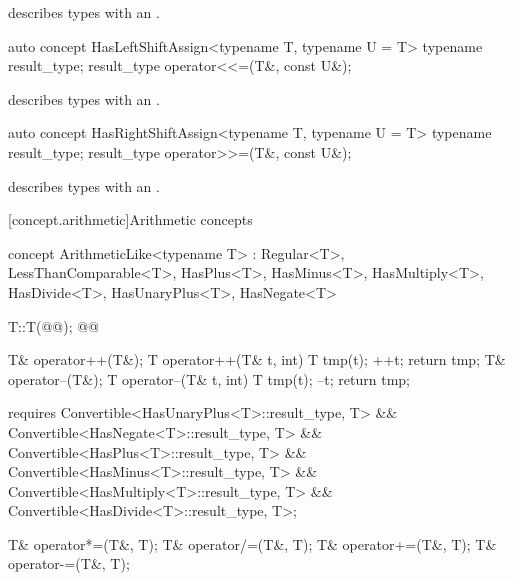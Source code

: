 \documentclass[american,twoside]{book}
\begin{document}
\begin{itemdescr}
\pnum
\mbox{\reallynote} describes types with an \mbox{}.
\end{itemdescr}

\begin{itemdecl}
auto concept HasLeftShiftAssign<typename T, typename U = T> {
  typename result_type;
  result_type operator<<=(T&, const U&);
}
\end{itemdecl}

\begin{itemdescr}
\pnum
\mbox{\reallynote} describes types with an \mbox{}.
\end{itemdescr}

\begin{itemdecl}
auto concept HasRightShiftAssign<typename T, typename U = T> {
  typename result_type;
  result_type operator>>=(T&, const U&);
}
\end{itemdecl}

\begin{itemdescr}
\pnum
\mbox{\reallynote} describes types with an \mbox{}.
\end{itemdescr}

[concept.arithmetic]{Arithmetic concepts}

\begin{itemdecl}
concept ArithmeticLike<typename T> 
  : Regular<T>, LessThanComparable<T>, HasPlus<T>, HasMinus<T>, HasMultiply<T>, HasDivide<T>, 
    HasUnaryPlus<T>, HasNegate<T> {
  T::T(@@);
  @@

  T& operator++(T&);
  T operator++(T& t, int) { T tmp(t); ++t; return tmp; }
  T& operator--(T&);
  T operator--(T& t, int) { T tmp(t); --t; return tmp; }

  requires Convertible<HasUnaryPlus<T>::result_type, T>
        && Convertible<HasNegate<T>::result_type, T>
        && Convertible<HasPlus<T>::result_type, T>
        && Convertible<HasMinus<T>::result_type, T>
        && Convertible<HasMultiply<T>::result_type, T>
        && Convertible<HasDivide<T>::result_type, T>;

  T& operator*=(T&, T);
  T& operator/=(T&, T);
  T& operator+=(T&, T);
  T& operator-=(T&, T);
}
\end{itemdecl}

\begin{itemdescr}
\pnum
{}
\end{itemdescr}
\end{document}
